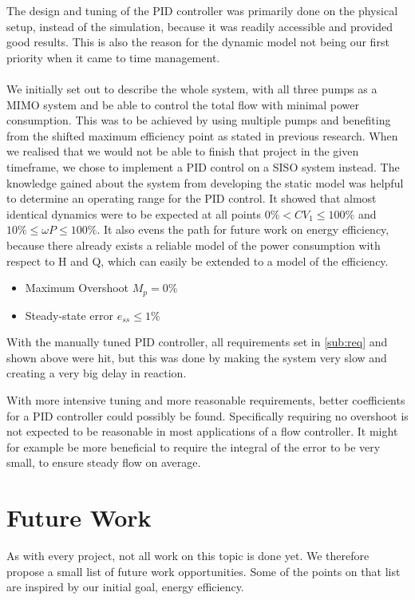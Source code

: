 The design and tuning of the PID controller was primarily done on the physical setup,
instead of the simulation, because it was readily accessible
and provided good results.
This is also the reason for the dynamic model not being our first priority when it came to time management.
\\\\We initially set out to describe the whole system,
with all three pumps as a MIMO system and be able to control the total flow with minimal power consumption.
This was to be achieved by using multiple pumps and benefiting from the shifted maximum efficiency point as stated in previous research.
When we realised that we would not be able to finish that project in the given timeframe,
we chose to implement a PID control on a SISO system instead.
The knowledge gained about the system from developing the static model was helpful to determine an operating range for the PID control.
It showed that almost identical dynamics were to be expected at all points
$0\%<CV_1\leq100\%$ and $10\%\leq\omega P\leq100\%$.
It also evens the path for future work on energy efficiency,
because there already exists a reliable model of the power consumption with respect to H and Q,
which can easily be extended to a model of the efficiency.

\begin{itemize}
\item Maximum Overshoot $M_p = 0\%$
\item Steady-state error $e_{ss} \leq 1 \%$
\end{itemize}

With the manually tuned PID controller,
all requirements set in \ref{sub:req} and shown above were hit,
but this was done by making the system very slow and creating a very big delay in reaction.

With more intensive tuning and more reasonable requirements,
better coefficients for a PID controller could possibly be found.
Specifically requiring no overshoot is not expected to be reasonable in most applications of a flow controller.
It might for example be more beneficial to require the integral of the error to be very small,
to ensure steady flow on average.

\section{Future Work}
As with every project, not all work on this topic is done yet.
We therefore propose a small list of future work opportunities.
Some of the points on that list are inspired by our initial goal,
energy efficiency.


